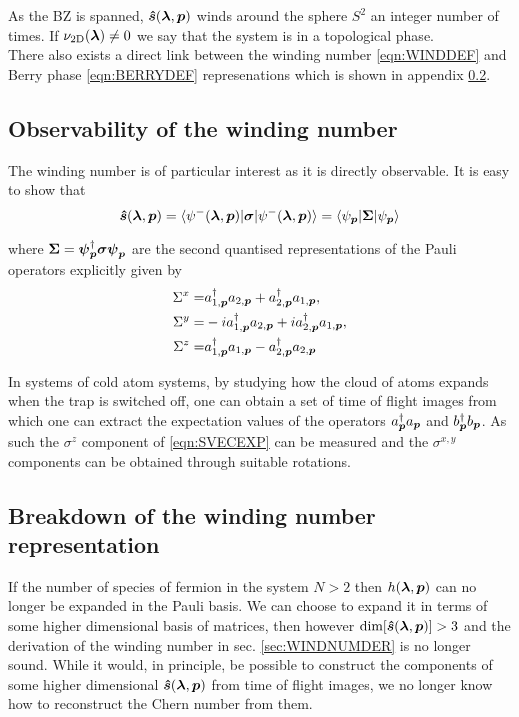 \noi As the BZ is spanned, $\boldsymbol{\hat{s}}(\boldsymbol{\lambda},\boldsymbol{p})$ winds around the sphere $S^{2}$ an integer number of times. If $\nu_{\text{2D}}(\boldsymbol{\lambda})\neq0$ we say that the system is in a topological phase.\\

There also exists a direct link between the winding number \eqref{eqn:WINDDEF} and Berry phase \eqref{eqn:BERRYDEF} represenations which is shown in appendix \ref{}.

\subsection{Observability of the winding number}

The winding number is of particular interest as it is directly observable. It is easy to show that
\begin{equation}\label{eqn:SVECEXP}
    \boldsymbol{\hat{s}}(\boldsymbol{\lambda},\boldsymbol{p})=\braket{\psi^{-}(\boldsymbol{\lambda},\boldsymbol{p})|\boldsymbol{\sigma}|\psi^{-}(\boldsymbol{\lambda},\boldsymbol{p})}=\braket{\psi_{\boldsymbol{p}}|\boldsymbol{\Sigma}|\psi_{\boldsymbol{p}}}
\end{equation}

\noi where $\boldsymbol{\Sigma}=\boldsymbol{\psi}_{\boldsymbol{p}}^{\dagger}\boldsymbol{\sigma}\boldsymbol{\psi}_{\boldsymbol{p}}$ are the second quantised representations of the Pauli operators explicitly given by
\begin{align}\label{eqn:SINGLEOBS}
    \Sigma^{x}=&a_{1,\boldsymbol{p}}^{\dagger}a_{2,\boldsymbol{p}}+a^{\dagger}_{2,\boldsymbol{p}}a_{1,\boldsymbol{p}},\nonumber\\
    \Sigma^{y}=&-ia_{1,\boldsymbol{p}}^{\dagger}a_{2,\boldsymbol{p}}+ia^{\dagger}_{2,\boldsymbol{p}}a_{1,\boldsymbol{p}},\nonumber\\
    \Sigma^{z}=&a_{1,\boldsymbol{p}}^{\dagger}a_{1,\boldsymbol{p}}-a^{\dagger}_{2,\boldsymbol{p}}a_{2,\boldsymbol{p}}
\end{align}  

In systems of cold atom systems, by studying how the cloud of atoms expands when the trap is switched off, one can obtain a set of time of flight images from which one can extract the expectation values of the operators $a_{\boldsymbol{p}}^{\dagger}a_{\boldsymbol{p}}$ and $b_{\boldsymbol{p}}^{\dagger}b_{\boldsymbol{p}}$. As such the $\sigma^{z}$ component of \eqref{eqn:SVECEXP} can be measured and the $\sigma^{x,y}$ components can be obtained through suitable rotations. 

\subsection{Breakdown of the winding number representation}

If the number of species of fermion in the system $N>2$ then $h(\boldsymbol{\lambda},\boldsymbol{p})$ can no longer be expanded in the Pauli basis. We can choose to expand it in terms of some higher dimensional basis of matrices,  then however $\text{dim}[\boldsymbol{\hat{s}}(\boldsymbol{\lambda},\boldsymbol{p})]>3$ and the derivation of the winding number in sec. \ref{sec:WINDNUMDER} is no longer sound. While it would, in principle, be possible to construct the components of some higher dimensional $\boldsymbol{\hat{s}}(\boldsymbol{\lambda},\boldsymbol{p})$ from time of flight images, we no longer know how to reconstruct the Chern number from them.

